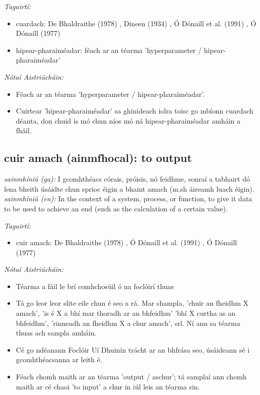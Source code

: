 \documentclass{article}
\begin{document}
 \noindent \textit{Tagairtí:}
\begin{itemize}
	\item cuardach: De Bhaldraithe (1978) \cite{de-bhaldraithe}, Dineen (1934) \cite{dineen}, Ó Dónaill et al. (1991) \cite{focloir-beag}, Ó Dónaill (1977) \cite{odonaill}
	\item hipear-pharaiméadar: féach ar an téarma 'hyperparameter / hipear-pharaiméadar'
\end{itemize}

 \noindent \textit{Nótaí Aistriúcháin:}
\begin{itemize}
	\item Féach ar an téarma 'hyperparameter / hipear-pharaiméadar'.
	\item Cuirtear 'hipear-pharaiméadar' sa ghinideach iolra toisc go mbíonn cuardach déanta, don chuid is mó chun níos mó ná hipear-pharaiméadar amháin a fháil.
\end{itemize}


\subsection*{cuir amach (ainmfhocal): to output} 
 \noindent \textit{sainmhíniú (ga):} I gcomhthéacs córais, próisis, nó feidhme, sonraí a tabhairt dó lena bheith úsáidte chun sprioc éigin a bhaint amach (m.sh áireamh luach éigin).
\newline\newline
 \noindent \textit{sainmhíniú (en):} In the context of a system, process, or function, to give it data to be used to achieve an end (such as the calculation of a certain value).
\newline

 \noindent \textit{Tagairtí:}
\begin{itemize}
	\item cuir amach: De Bhaldraithe (1978) \cite{de-bhaldraithe}, Ó Dónaill et al. (1991) \cite{focloir-beag}, Ó Dónaill (1977) \cite{odonaill}
\end{itemize}

 \noindent \textit{Nótaí Aistriúcháin:}
\begin{itemize}
	\item Téarma a fáil le brí comhchosúil ó na foclóirí thuas
	\item Tá go leor leor slite eile chun é seo a rá. Mar shampla, 'chuir an fheidhm X amach', 'is é X a bhí mar thoradh ar an bhfeidhm' 'bhí X curtha as an bhfeidhm', 'rinneadh an fheidhm X a chur amach', srl. Ní ann sa téarma thuas ach sampla amháin.
	\item Cé go ndéanann Foclóir Uí Dhuinín trácht ar an bhfrása seo, úsáideann sé i gcomhthéacsanna ar leith é.
	\item Féach chomh maith ar an téarma 'output / aschur'; tá samplaí ann chomh maith ar cé chaoi 'to input' a chur in iúl leis an téarma sin.
\end{itemize}
\end{document}
